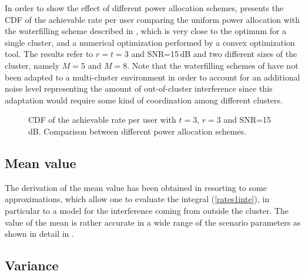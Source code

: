 In order to show the effect of different power allocation schemes,  presents the CDF of the achievable rate per user comparing the uniform power allocation with the waterfilling scheme described in \cite{armada11b}, which is very close to the optimum for a single cluster, and a numerical optimization performed by a convex optimization tool. The results refer to $r=t=3$  and SNR=15\,dB and two different sizes of the cluster, namely $M=5$ and $M=8$. Note that the waterfilling schemes of \cite{armada11b} have not been adapted to a multi-cluster environment in order to account for an additional noise level representing the amount of out-of-cluster interference since this adaptation would require some kind of coordination among different clusters.
\begin{figure}[t]
\begin{center}
\begin{small}
\end{small}
\end{center}
\vspace*{-2.2mm}\caption{CDF of the achievable rate per user with $t=3$, $r=3$ and SNR=15\,dB. Comparison between different power allocation schemes.}\label{CDFgamma_power}
\end{figure}

\subsection{Mean value}

The derivation of the mean value has been obtained in \cite{corvaja13b} resorting to some approximations, which allow one to evaluate the integral (\ref{rates1inte}), in particular to a model for the interference coming from outside the cluster. The value of the mean is rather accurate in a wide range of the scenario parameters as shown in detail in \cite{corvaja13b}.

\subsection{Variance}

